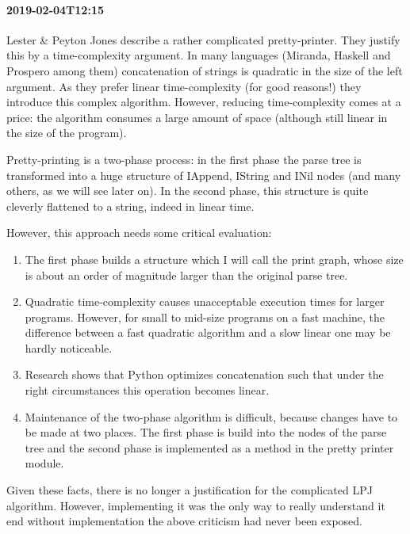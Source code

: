 \documentclass[11pt, a4paper]{article}
\begin{document}
\paragraph{2019-02-04T12:15}
Lester \& Peyton Jones describe a rather complicated pretty-printer.
They justify this by a time-complexity argument.
In many languages (Miranda, Haskell and Prospero among them) concatenation of strings is quadratic in the size of the left argument.
As they prefer linear time-complexity (for good reasons!) they introduce this complex algorithm.
However, reducing time-complexity comes at a price: the algorithm consumes a large amount of space (although still linear in the size of the program).

Pretty-printing is a two-phase process: in the first phase the parse tree is transformed into a huge structure of IAppend, IString and INil nodes (and many others, as we will see later on).
In the second phase, this structure is quite cleverly flattened to a string, indeed in linear time.

However, this approach needs some critical evaluation:

\begin{enumerate}
\item The first phase builds a structure which I will call the print graph, whose size is about an order of magnitude larger than the original parse tree.

\item Quadratic time-complexity causes unacceptable execution times for larger programs.
However, for small to mid-size programs on a fast machine, the difference between a fast quadratic algorithm and a slow linear one may be hardly noticeable.

\item Research shows that Python optimizes concatenation such that under the right circumstances this operation becomes linear.

\item Maintenance of the two-phase algorithm is difficult, because changes have to be made at two places.
The first phase is build into the nodes of the parse tree and the second phase is implemented as a method in the pretty printer module.

\end{enumerate}

Given these facts, there is no longer a justification for the complicated LPJ algorithm.
However, implementing it was the only way to really understand it end without implementation the above criticism had never been exposed.
\end{document}

